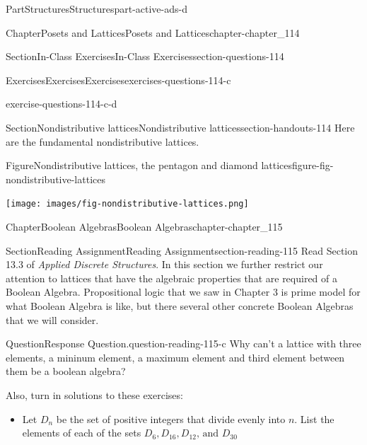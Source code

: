 \documentclass[oneside,10pt,]{book}
\numberwithin{equation}{section}
\begin{document}
\begin{partptx}{Part}{Structures}{}{Structures}{}{}{part-active-ads-d}
\begin{chapterptx}{Chapter}{Posets and Lattices}{}{Posets and Lattices}{}{}{chapter-chapter_114}
\begin{sectionptx}{Section}{In-Class Exercises}{}{In-Class Exercises}{}{}{section-questions-114}
\begin{exercises-subsection-numberless}{Exercises}{Exercises}{}{Exercises}{}{}{exercises-questions-114-c}
\begin{divisionexercise}{4}{}{}{exercise-questions-114-c-d}
\end{divisionexercise}%
\end{exercises-subsection-numberless}
\end{sectionptx}
%
%
\typeout{************************************************}
\typeout{************************************************}
%
\begin{sectionptx}{Section}{Nondistributive lattices}{}{Nondistributive lattices}{}{}{section-handouts-114}
%
Here are the fundamental nondistributive lattices.%
\begin{figureptx}{Figure}{Nondistributive lattices, the pentagon and diamond lattices}{figure-fig-nondistributive-lattices}{}%
\begin{image}{0.25}{0.5}{0.25}{}%
\texttt{[image: images/fig-nondistributive-lattices.png]}
\end{image}%
\tcblower
\end{figureptx}%
\end{sectionptx}
\end{chapterptx}
%
\typeout{************************************************}
\typeout{************************************************}
%
\begin{chapterptx}{Chapter}{Boolean Algebras}{}{Boolean Algebras}{}{}{chapter-chapter_115}
\renewcommand*{\chaptername}{Chapter}
%
%
%
\typeout{************************************************}
\typeout{************************************************}
%
\begin{sectionptx}{Section}{Reading Assignment}{}{Reading Assignment}{}{}{section-reading-115}
Read Section 13.3 of \emph{Applied Discrete Structures}.  In this section we further restrict our attention to lattices that have the algebraic properties that are required of a Boolean Algebra. Propositional logic that we saw in Chapter 3 is prime model for what Boolean Algebra is like, but there several other concrete Boolean Algebras that we will consider.%
\begin{question}{Question}{Response Question.}{question-reading-115-c}%
Why can't a lattice with three elements, a mininum element, a maximum element and third element between them be a boolean algebra?%
\end{question}
Also, turn in solutions to these exercises:%
\begin{itemize}[label=\textbullet]
\item{}Let \(D_n\) be the set of positive integers that divide evenly into \(n\).  List the elements of each of the sets \(D_{6}, D_{16}, D_{12}\textrm{, and }D_{30}\)%

\end{itemize}
\end{sectionptx}
\end{chapterptx}
\end{partptx}
\end{document}
